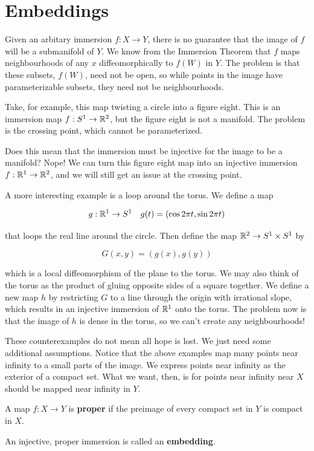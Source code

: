 \section{Embeddings}

Given an arbitary immersion $f: X \to Y$, there is no guarantee that the image of $f$ will be a submanifold of $Y$. We know from the Immersion Theorem that $f$ maps neighbourhoods of any $x$ diffeomorphically to $f(W)$ in $Y$. The problem is that these subsets, $f(W)$, need not be open, so while points in the image have parameterizable subsets, they need not be neighbourhoods. 

Take, for example, this map twisting a circle into a figure eight. This is an immersion map $f: S^1 \to \mathbb{R}^2$, but the figure eight is not a manifold. The problem is the crossing point, which cannot be parameterized. 

Does this mean that the immersion must be injective for the image to be a manifold? Nope! We can turn this figure eight map into an injective immersion $f: \mathbb{R}^1 \to \mathbb{R}^2$, and we will still get an issue at the crossing point. 

A more interesting example is a loop around the torus. We define a map

\[g: \mathbb{R}^1 \to S^1 \quad g(t) = (\cos 2\pi t, \sin 2\pi t)\]

that loops the real line around the circle. Then define the map $\mathbb{R}^2 \to S^1 \times S^1$ by

\[G(x,y) = (g(x),g(y))\]

which is a local diffeomorphism of the plane to the torus. We may also think of the torus as the product of gluing opposite sides of a square together. We define a new map $h$ by restricting $G$ to a line through the origin with irrational slope, which results in an injective immersion of $\mathbb{R}^1$ onto the torus. The problem now is that the image of $h$ is dense in the torus, so we can't create any neighbourhoods! 

These counterexamples do not mean all hope is lost. We just need some additional assumptions. Notice that the above examples map many points near infinity to a small parts of the image. We express points near infinity as the exterior of a compact set. What we want, then, is for points near infinity near $X$ should be mapped near infinity in $Y$. 

\begin{definition}
    A map $f: X \to Y$ is \textbf{proper} if the preimage of every compact set in $Y$ is compact in $X$.

    An injective, proper immersion is called an \textbf{embedding}. 
\end{definition}

